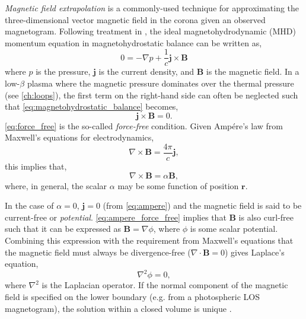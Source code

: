 
\textit{Magnetic field extrapolation} is a commonly-used technique for approximating the three-dimensional vector magnetic field in the corona given an observed magnetogram. Following treatment in \citet[Chapter 3]{priest_magnetohydrodynamics_2014}, the ideal magnetohydrodynamic (MHD) momentum equation in magnetohydrostatic balance can be written as,
\begin{equation}\label{eq:magnetohydrostatic_balance}
    0 = -\nabla p + \frac{1}{c}\mathbf{j}\times\mathbf{B}
\end{equation}
where $p$ is the pressure, $\mathbf{j}$ is the current density, and $\mathbf{B}$ is the magnetic field. In a low-$\beta$ plasma where the magnetic pressure dominates over the thermal pressure (see \autoref{ch:loops}), the first term on the right-hand side can often be neglected such that \autoref{eq:magnetohydrostatic_balance} becomes,
\begin{equation}\label{eq:force_free}
    \mathbf{j}\times\mathbf{B} = 0.
\end{equation}
\autoref{eq:force_free} is the so-called \textit{force-free} condition. Given Amp\'{e}re's law from Maxwell's equations for electrodynamics,
\begin{equation}\label{eq:ampere}
    \nabla\times\mathbf{B} = \frac{4\pi}{c}\mathbf{j},
\end{equation}
this implies that,
\begin{equation}\label{eq:ampere_force_free}
    \nabla\times\mathbf{B} = \alpha\mathbf{B},
\end{equation}
where, in general, the scalar $\alpha$ may be some function of position $\mathbf{r}$.

In the case of $\alpha=0$, $\mathbf{j}=0$ (from \autoref{eq:ampere}) and the magnetic field is said to be current-free or \textit{potential}. \autoref{eq:ampere_force_free} implies that $\mathbf{B}$ is also curl-free such that it can be expressed as $\mathbf{B}=\nabla\phi$, where $\phi$ is some scalar potential. Combining this expression with the requirement from Maxwell's equations that the magnetic field must always be divergence-free ($\nabla\cdot\mathbf{B}=0$) gives Laplace's equation,
\begin{equation}\label{eq:laplace}
    \nabla^2\phi = 0,
\end{equation}
where $\nabla^2$ is the Laplacian operator. If the normal component of the magnetic field is specified on the lower boundary (e.g. from a photospheric LOS magnetogram), the solution within a closed volume is unique \citep{priest_magnetohydrodynamics_2014}.

